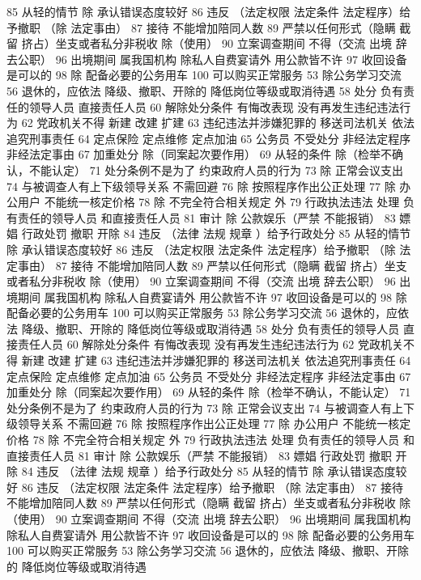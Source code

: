 \documentclass[cyan]{elegantnote}
\begin{document}
85 从轻的情节
除 承认错误态度较好
86 违反 （法定权限 法定条件 法定程序）给予撤职
（除 法定事由）
87 接待 不能增加陪同人数
89 严禁以任何形式（隐瞒 截留 挤占）坐支或者私分非税收
除（使用）
90 立案调查期间 不得（交流 出境 辞去公职）
96 出境期间 属我国机构 除私人自费宴请外 用公款皆不许
97 收回设备是可以的
98 除 配备必要的公务用车
100 可以购买正常服务
53 除公务学习交流
56 退休的，应依法
降级、撤职、开除的 降低岗位等级或取消待遇
58 处分
负有责任的领导人员
直接责任人员
60 解除处分条件
有悔改表现
没有再发生违纪违法行为
62 党政机关不得
新建 改建 扩建
63 违纪违法并涉嫌犯罪的
移送司法机关
依法追究刑事责任
64 定点保险 定点维修 定点加油
65 公务员 不受处分
非经法定程序
非经法定事由
67 加重处分
除（同案起次要作用）
69 从轻的条件
除（检举不确认，不能认定）
71 处分条例不是为了
约束政府人员的行为
73 除 正常会议支出
74 与被调查人有上下级领导关系 不需回避
76 除 按照程序作出公正处理
77 除 办公用户
不能统一核定价格
78 除 不完全符合相关规定 外
79 行政执法违法 处理
负有责任的领导人员
和直接责任人员
81 审计
除 公款娱乐（严禁 不能报销）
83 嫖娼 行政处罚
撤职 开除
84 违反 （法律 法规 规章 ）给予行政处分
85 从轻的情节
除 承认错误态度较好
86 违反 （法定权限 法定条件 法定程序）给予撤职
（除 法定事由）
87 接待 不能增加陪同人数
89 严禁以任何形式（隐瞒 截留 挤占）坐支或者私分非税收
除（使用）
90 立案调查期间 不得（交流 出境 辞去公职）
96 出境期间 属我国机构 除私人自费宴请外 用公款皆不许
97 收回设备是可以的
98 除 配备必要的公务用车
100 可以购买正常服务
53 除公务学习交流
56 退休的，应依法
降级、撤职、开除的 降低岗位等级或取消待遇
58 处分
负有责任的领导人员
直接责任人员
60 解除处分条件
有悔改表现
没有再发生违纪违法行为
62 党政机关不得
新建 改建 扩建
63 违纪违法并涉嫌犯罪的
移送司法机关
依法追究刑事责任
64 定点保险 定点维修 定点加油
65 公务员 不受处分
非经法定程序
非经法定事由
67 加重处分
除（同案起次要作用）
69 从轻的条件
除（检举不确认，不能认定）
71 处分条例不是为了
约束政府人员的行为
73 除 正常会议支出
74 与被调查人有上下级领导关系 不需回避
76 除 按照程序作出公正处理
77 除 办公用户
不能统一核定价格
78 除 不完全符合相关规定 外
79 行政执法违法 处理
负有责任的领导人员
和直接责任人员
81 审计
除 公款娱乐（严禁 不能报销）
83 嫖娼 行政处罚
撤职 开除
84 违反 （法律 法规 规章 ）给予行政处分
85 从轻的情节
除 承认错误态度较好
86 违反 （法定权限 法定条件 法定程序）给予撤职
（除 法定事由）
87 接待 不能增加陪同人数
89 严禁以任何形式（隐瞒 截留 挤占）坐支或者私分非税收
除（使用）
90 立案调查期间 不得（交流 出境 辞去公职）
96 出境期间 属我国机构 除私人自费宴请外 用公款皆不许
97 收回设备是可以的
98 除 配备必要的公务用车
100 可以购买正常服务
53 除公务学习交流
56 退休的，应依法
降级、撤职、开除的 降低岗位等级或取消待遇
\end{document}
